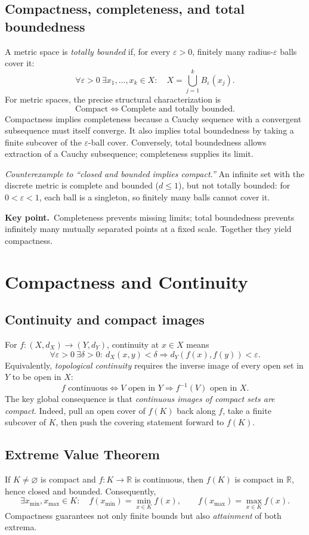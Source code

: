 \documentclass[10pt,a4paper]{article}
\newcommand{\R}{\mathbb R}
\newcommand{\eps}{\varepsilon}
\newcommand{\key}[1]{\par\smallskip\textcolor{accent}{\textbf{Key point.}}\ #1\par}
\begin{document}
\subsection{Compactness, completeness, and total boundedness}
A metric space is \emph{totally bounded} if, for every $\eps>0$, finitely many radius-$\eps$ balls cover it:
\[
\forall\eps>0\ \exists x_1,\ldots,x_k\in X:\quad X=\bigcup_{j=1}^k B_\eps(x_j).
\]
For metric spaces, the precise structural characterization is
\[
\boxed{\text{Compact}\iff\text{Complete and totally bounded}.}
\]
Compactness implies completeness because a Cauchy sequence with a convergent subsequence must itself converge. It also implies total boundedness by taking a finite subcover of the $\eps$-ball cover. Conversely, total boundedness allows extraction of a Cauchy subsequence; completeness supplies its limit.

\emph{Counterexample to ``closed and bounded implies compact.''} An infinite set with the discrete metric is complete and bounded ($d\le1$), but not totally bounded: for $0<\eps<1$, each ball is a singleton, so finitely many balls cannot cover it.

\key{Completeness prevents missing limits; total boundedness prevents infinitely many mutually separated points at a fixed scale. Together they yield compactness.}

\section{Compactness and Continuity}
\subsection{Continuity and compact images}
For $f:(X,d_X)\to(Y,d_Y)$, continuity at $x\in X$ means
\[
\forall\eps>0\ \exists\delta>0:\ d_X(x,y)<\delta\Rightarrow d_Y(f(x),f(y))<\eps.
\]
Equivalently, \emph{topological continuity} requires the inverse image of every open set in $Y$ to be open in $X$:
\[
\boxed{f\text{ continuous}\iff V\text{ open in }Y\Rightarrow f^{-1}(V)\text{ open in }X.}
\]
The key global consequence is that \emph{continuous images of compact sets are compact}. Indeed, pull an open cover of $f(K)$ back along $f$, take a finite subcover of $K$, then push the covering statement forward to $f(K)$.

\subsection{Extreme Value Theorem}
If $K\ne\varnothing$ is compact and $f:K\to\R$ is continuous, then $f(K)$ is compact in $\R$, hence closed and bounded. Consequently,
\[
\boxed{\exists x_{\min},x_{\max}\in K:\quad
f(x_{\min})=\min_{x\in K}f(x),\qquad
f(x_{\max})=\max_{x\in K}f(x).}
\]
Compactness guarantees not only finite bounds but also \emph{attainment} of both extrema.
\end{document}

